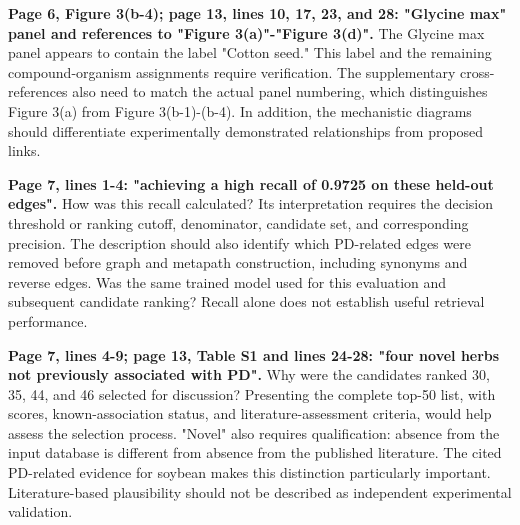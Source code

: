 \documentclass[11pt,american]{article}
\begin{document}
\begin{revresponse}

\end{revresponse}

\begin{revcomment}
\textbf{Page 6, Figure 3(b-4); page 13, lines 10, 17, 23, and 28: "Glycine max" panel and references to "Figure 3(a)"-"Figure 3(d)".} The Glycine max panel appears to contain the label "Cotton seed." This label and the remaining compound-organism assignments require verification. The supplementary cross-references also need to match the actual panel numbering, which distinguishes Figure 3(a) from Figure 3(b-1)-(b-4). In addition, the mechanistic diagrams should differentiate experimentally demonstrated relationships from proposed links.
\end{revcomment}

\begin{revresponse}

\end{revresponse}

\begin{revcomment}
\textbf{Page 7, lines 1-4: "achieving a high recall of 0.9725 on these held-out edges".} How was this recall calculated? Its interpretation requires the decision threshold or ranking cutoff, denominator, candidate set, and corresponding precision. The description should also identify which PD-related edges were removed before graph and metapath construction, including synonyms and reverse edges. Was the same trained model used for this evaluation and subsequent candidate ranking? Recall alone does not establish useful retrieval performance.
\end{revcomment}

\begin{revresponse}

\end{revresponse}

\begin{revcomment}
\textbf{Page 7, lines 4-9; page 13, Table S1 and lines 24-28: "four novel herbs not previously associated with PD".} Why were the candidates ranked 30, 35, 44, and 46 selected for discussion? Presenting the complete top-50 list, with scores, known-association status, and literature-assessment criteria, would help assess the selection process. "Novel" also requires qualification: absence from the input database is different from absence from the published literature. The cited PD-related evidence for soybean makes this distinction particularly important. Literature-based plausibility should not be described as independent experimental validation.
\end{revcomment}
\end{document}
